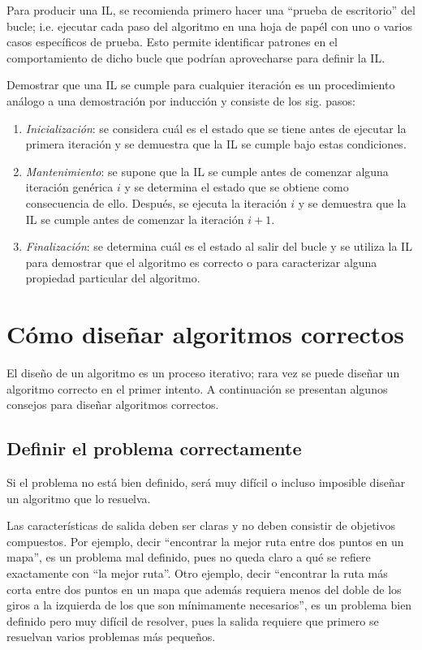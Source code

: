 Para producir una IL, se recomienda primero hacer
una ``prueba de escritorio'' del bucle; i.e. ejecutar cada paso
del algoritmo en una hoja de papél con uno o varios casos específicos
de prueba. Esto permite identificar patrones en el comportamiento
de dicho bucle que podrían aprovecharse para definir la IL. 

Demostrar que una IL se cumple para cualquier iteración
es un procedimiento análogo a una demostración por inducción y consiste
de los sig. pasos: 

\begin{enumerate}
    \item \emph{Inicialización}: se considera cuál es el estado que se tiene
    antes de ejecutar la primera iteración y se demuestra que la IL se cumple bajo estas condiciones.
    \item \emph{Mantenimiento}: se supone que la IL se cumple
    antes de comenzar alguna iteración genérica $i$ y se determina el
    estado que se obtiene como consecuencia de ello. Después, se ejecuta
    la iteración $i$ y se demuestra que la IL se cumple antes
    de comenzar la iteración $i+1$.
    \item \emph{Finalización}: se determina cuál es el estado al salir del bucle
    y se utiliza la IL para demostrar que el algoritmo
    es correcto o para caracterizar alguna propiedad particular del algoritmo. 
\end{enumerate}

\section{Cómo diseñar algoritmos correctos}

El diseño de un algoritmo es un proceso iterativo; rara vez se puede
diseñar un algoritmo correcto en el primer intento. A continuación
se presentan algunos consejos para diseñar algoritmos correctos. 

\subsection{Definir el problema correctamente}

Si el problema no está bien definido, será muy difícil o incluso imposible
diseñar un algoritmo que lo resuelva. 

Las características de salida
deben ser claras y no deben consistir de objetivos compuestos. Por
ejemplo, decir ``encontrar la mejor ruta entre dos puntos en un mapa'',
es un problema mal definido, pues no queda claro a qué se refiere
exactamente con ``la mejor ruta''. Otro ejemplo, decir ``encontrar
la ruta más corta entre dos puntos en un mapa que además requiera
menos del doble de los giros a la izquierda de los que son mínimamente
necesarios'', es un problema bien definido pero muy difícil de resolver,
pues la salida requiere que primero se resuelvan varios problemas más pequeños.

